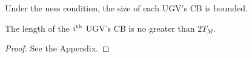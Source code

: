 	Under the \fc ness condition, the size of each UGV's CB is bounded.
	
	\begin{thm}\label{thm:max_CB_size}
		The length of the $i^\text{th}$ UGV's CB is no greater than $2T_M$.
	\end{thm}
	
	\begin{proof}
		See the Appendix.
	\end{proof}
	
%		
	
